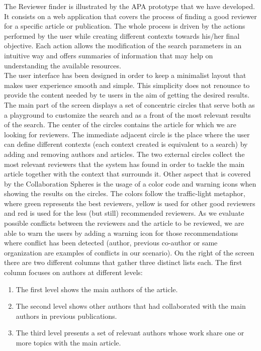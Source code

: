 The Reviewer finder is illustrated by the APA prototype that we have developed. It consists on a web application that covers the process of finding a good reviewer for a specific article or publication. The whole process is driven by the actions performed by the user while creating different contexts towards his/her final objective. Each action allows the modification of the search parameters in an intuitive way and offers summaries of information that may help on understanding the available resources.\\
The user interface has been designed in order to keep a minimalist layout that makes user experience smooth and simple. This simplicity does not renounce to provide the content needed by te users in the aim of getting the desired results. The main part of the screen displays a set of concentric circles that serve both as a playground to customize the search and as a front of the most relevant results of the search. 
The center of the circles contains the article for which we are looking for reviewers. The immediate adjacent circle is the place where the user can define different contexts (each context created is equivalent to a search) by adding and removing authors and articles. The two external circles collect the most relevant reviewers that the system has found in order to tackle the main article together with the context that surrounds it.
Other aspect that is covered by the Collaboration Spheres is the usage of a color code and warning icons when showing the results on the circles. The colors follow the traffic-light metaphor, where green represents the best reviewers, yellow is used for other good reviewers and red is used for the less (but still) recommended reviewers. As we evaluate possible conflicts between the reviewers and the article to be reviewed, we are able to warn the users by adding a warning icon for those recommendations where conflict has been detected (author, previous co-author or same organization are examples of conflicts in our scenario). 
On the right of the screen there are two different columns that gather three distinct lists each. The first column focuses on authors at different levels: 
\begin{enumerate}
  \item The first level shows the main authors of the article.
  \item The second level shows other authors that had collaborated with the main authors in previous publications.
  \item The third level presents a set of relevant authors whose work share one or more topics with the main article.
\end{enumerate}
